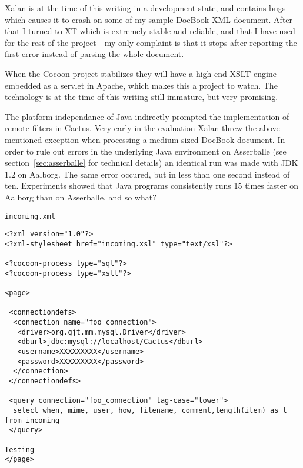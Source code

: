 Xalan is at the time of this writing in a development state, and
contains bugs which causes it to crash on some of my sample DocBook
XML document.  After that I turned to XT which is extremely stable and
reliable, and that I have used for the rest of the project - my only
complaint is that it stops after reporting the first error instead of
parsing the whole document.


When the Cocoon project stabilizes they will have a
high end XSLT-engine embedded as a servlet in Apache, which makes this
a project to watch.  The technology is at the time of this writing
still immature, but very promising.

The platform independance of Java indirectly prompted the
implementation of remote filters in Cactus.  Very early in the
evaluation Xalan threw the above mentioned exception when processing a
medium sized DocBook document.  In order to rule out errors in the
underlying Java environment on Asserballe (see
section~\vref{sec:asserballe} for technical details) an identical run
was made with JDK 1.2 on Aalborg.  The same error occured, but in less
than one second instead of ten.  Experiments showed that Java programs
consistently runs 15 times faster on Aalborg than on Asserballe.
\textsf{and so what?}

\textsf{\texttt{incoming.xml}}
\begin{verbatim}
<?xml version="1.0"?>
<?xml-stylesheet href="incoming.xsl" type="text/xsl"?>

<?cocoon-process type="sql"?>
<?cocoon-process type="xslt"?>

<page>

 <connectiondefs>
  <connection name="foo_connection">
   <driver>org.gjt.mm.mysql.Driver</driver>
   <dburl>jdbc:mysql://localhost/Cactus</dburl>
   <username>XXXXXXXXX</username>
   <password>XXXXXXXXX</password>
  </connection>
 </connectiondefs> 
 
 <query connection="foo_connection" tag-case="lower">
  select when, mime, user, how, filename, comment,length(item) as l  from incoming
 </query>

Testing 
</page>
\end{verbatim}

